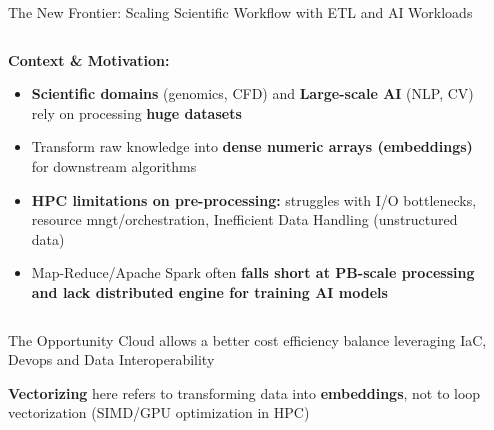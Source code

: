 \documentclass[aspectratio=169]{beamer}
\begin{document}
\begin{frame}{The New Frontier: Scaling Scientific Workflow with ETL and AI Workloads}
    \begin{columns}
        \begin{column}{0.8\textwidth}
            \textbf{Context \& Motivation:}
            \begin{itemize}
                \item \textbf{Scientific domains} (genomics, CFD) and \textbf{Large-scale AI} (NLP, CV) rely on processing \textbf{huge datasets}
                \item Transform raw knowledge into \textcolor{rayblue}{\textbf{dense numeric arrays (embeddings)}} for downstream algorithms
                \item \textbf{HPC limitations on pre-processing:} struggles with I/O bottlenecks, resource mngt/orchestration, Inefficient Data Handling (unstructured data)
                \item Map-Reduce/Apache Spark often \textbf{falls short at PB-scale processing and lack distributed engine for training AI models}
            \end{itemize}
        \end{column}
        \begin{column}{0.2\textwidth}
        \end{column}
    \end{columns}
    
    \vspace{0.3cm}
    \begin{block}{The Opportunity}
        Cloud allows a better cost efficiency balance leveraging IaC, Devops and Data Interoperability
        
        \textbf{Vectorizing} here refers to transforming data into \textbf{embeddings}, not to loop vectorization (SIMD/GPU optimization in HPC)
    \end{block}
\end{frame}
\end{document}
